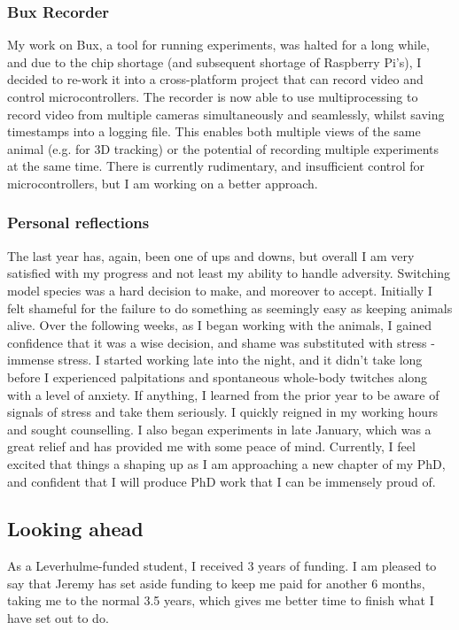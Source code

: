 \subsubsection{Bux Recorder}
My work on Bux, a tool for running experiments, was halted for a long while, and due to the chip shortage (and subsequent shortage of Raspberry Pi's), I decided to re-work it into a cross-platform project that can record video and control microcontrollers. The recorder is now able to use multiprocessing to record video from multiple cameras simultaneously and seamlessly, whilst saving timestamps into a logging file. This enables both multiple views of the same animal (e.g. for 3D tracking) or the potential of recording multiple experiments at the same time. There is currently rudimentary, and insufficient control for microcontrollers, but I am working on a better approach.

\subsubsection{Personal reflections}
The last year has, again, been one of ups and downs, but overall I am very satisfied with my progress and not least my ability to handle adversity. Switching model species was a hard decision to make, and moreover to accept. Initially I felt shameful for the failure to do something as seemingly easy as keeping animals alive. Over the following weeks, as I began working with the animals, I gained confidence that it was a wise decision, and shame was substituted with stress - immense stress. I started working late into the night, and it didn't take long before I experienced palpitations and spontaneous whole-body twitches along with a level of anxiety. If anything, I learned from the prior year to be aware of signals of stress and take them seriously. I quickly reigned in my working hours and sought counselling. I also began experiments in late January, which was a great relief and has provided me with some peace of mind. Currently, I feel excited that things a shaping up as I am approaching a new chapter of my PhD, and confident that I will produce PhD work that I can be immensely proud of.

\subsection{Looking ahead}
As a Leverhulme-funded student, I received 3 years of funding. I am pleased to say that Jeremy has set aside funding to keep me paid for another 6 months, taking me to the normal 3.5 years, which gives me better time to finish what I have set out to do.